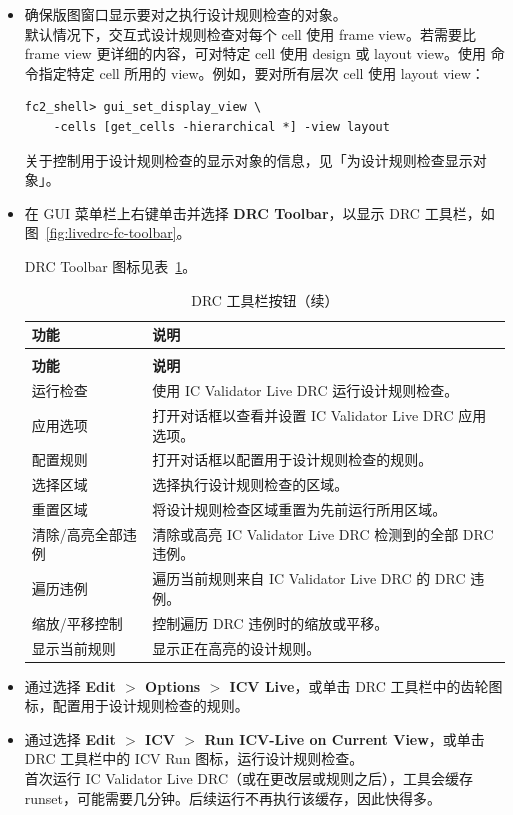 \begin{itemize}
  \item 确保版图窗口显示要对之执行设计规则检查的对象。\\
  默认情况下，交互式设计规则检查对每个 cell 使用 frame view。若需要比 frame view 更详细的内容，可对特定 cell 使用 design 或 layout view。使用  命令指定特定 cell 所用的 view。例如，要对所有层次 cell 使用 layout view：
\begin{lstlisting}
fc2_shell> gui_set_display_view \
    -cells [get_cells -hierarchical *] -view layout
\end{lstlisting}
  关于控制用于设计规则检查的显示对象的信息，见「为设计规则检查显示对象」。

  \item 在 GUI 菜单栏上右键单击并选择 \textbf{DRC Toolbar}，以显示 DRC 工具栏，如图~\ref{fig:livedrc-fc-toolbar}。


  DRC Toolbar 图标见表~\ref{tab:livedrc-drc-toolbar}。

\begin{longtable}{@{}>{\raggedright\arraybackslash}p{} p{}@{}}
\caption{DRC 工具栏按钮}\label{tab:livedrc-drc-toolbar}\\
\toprule
\textbf{功能} & \textbf{说明} \\
\midrule
\endfirsthead
\caption[]{DRC 工具栏按钮（续）}\\
\toprule
\textbf{功能} & \textbf{说明} \\
\midrule
\endhead
\bottomrule
\endfoot
运行检查 & 使用 IC Validator Live DRC 运行设计规则检查。 \\
应用选项 & 打开对话框以查看并设置 IC Validator Live DRC 应用选项。 \\
配置规则 & 打开对话框以配置用于设计规则检查的规则。 \\
选择区域 & 选择执行设计规则检查的区域。 \\
重置区域 & 将设计规则检查区域重置为先前运行所用区域。 \\
清除/高亮全部违例 & 清除或高亮 IC Validator Live DRC 检测到的全部 DRC 违例。 \\
遍历违例 & 遍历当前规则来自 IC Validator Live DRC 的 DRC 违例。 \\
缩放/平移控制 & 控制遍历 DRC 违例时的缩放或平移。 \\
显示当前规则 & 显示正在高亮的设计规则。 \\
\end{longtable}

  \item 通过选择 \textbf{Edit $>$ Options $>$ ICV Live}，或单击 DRC 工具栏中的齿轮图标，配置用于设计规则检查的规则。
  \item 通过选择 \textbf{Edit $>$ ICV $>$ Run ICV-Live on Current View}，或单击 DRC 工具栏中的 ICV Run 图标，运行设计规则检查。\\
  首次运行 IC Validator Live DRC（或在更改层或规则之后），工具会缓存 runset，可能需要几分钟。后续运行不再执行该缓存，因此快得多。
\end{itemize}

